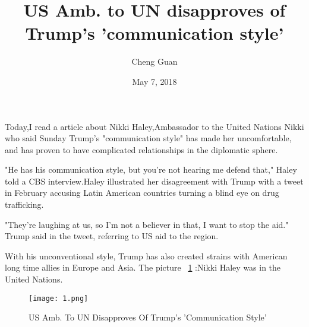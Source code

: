 \documentclass[12pt]{article}
\begin{document}
\title{US Amb. to UN disapproves of Trump's 'communication style'}
\author{Cheng Guan}
\date{May 7, 2018}
\maketitle
\setlength{\baselineskip}{20pt}

 Today,I read a article about Nikki Haley,Ambassador to the United Nations Nikki
 who  said Sunday Trump's "communication style" has made her uncomfortable,
and has proven to have complicated relationships in the diplomatic sphere.

"He has his communication style, but you're not hearing me defend that,"
Haley told a CBS interview.Haley illustrated her disagreement with Trump with a tweet in February accusing Latin American countries turning a blind eye on drug trafficking.

"They're laughing at us, so I'm not a believer in that, I want to stop the aid."
Trump said in the tweet, referring to US aid to the region.\cite{test2}

With his unconventional style, Trump has also created strains with American long time allies in Europe and Asia.
The picture ~\ref{fig1} :Nikki Haley was in the United Nations.


  \begin{figure}[htbp]
  \centering
  \texttt{[image: 1.png]}\\
  \caption{US Amb. To UN Disapproves Of Trump's 'Communication Style'}\label{fig1}
 \end{figure}



\end{document}
